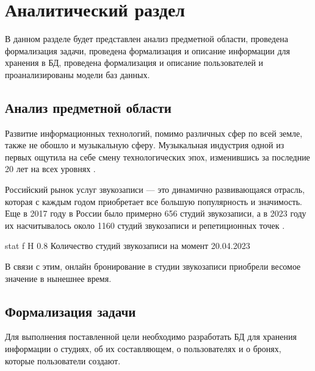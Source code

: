 
\chapter{Аналитический раздел}
В данном разделе будет представлен анализ предметной области, проведена формализация задачи, проведена формализация и описание информации для хранения в БД, проведена формализация и описание пользователей и проанализированы модели баз данных. 
\section{Анализ предметной области}
Развитие информационных технологий, помимо различных сфер по всей земле, также не обошло и музыкальную сферу.
Музыкальная индустрия одной из первых ощутила на себе смену технологических эпох, изменившись за последние 20 лет на всех уровнях \cite{music_and_it}.

Российский рынок услуг звукозаписи --- это динамично развивающаяся отрасль, которая с каждым годом приобретает все большую популярность и значимость.
Еще в 2017 году в России было примерно 656 студий звукозаписи, а в 2023 году их насчитывалось около 1160 студий звукозаписи и репетиционных точек \cite{music_stat}.



{stat} %
{f} %
{H} %
{0.8\textwidth} %
{Количество студий звукозаписи на момент 20.04.2023 \cite{music_stat}} %



В связи с этим, онлайн бронирование в студии звукозаписи приобрели весомое значение в нынешнее время.

\section{Формализация задачи}
Для выполнения поставленной цели необходимо разработать БД для хранения информации о студиях, об их составляющем, о пользователях и о бронях, которые пользователи создают.

